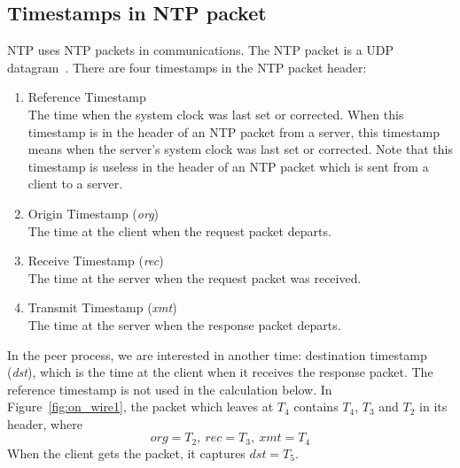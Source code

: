 \subsection{Timestamps in NTP packet}%
\label{sub:timestamps_in_ntp_packet}
NTP uses NTP packets in communications. The NTP packet is a UDP
datagram~\cite{rfc5905}. There are four timestamps in the NTP packet header:
\begin{enumerate}
    \item Reference Timestamp\\
        The time when the system clock was last set or corrected. When this
        timestamp is in the header of an NTP packet from a server, this
        timestamp means when the server's system clock was last set or
        corrected. Note that this timestamp is useless in the header of an NTP
        packet which is sent from a client to a server. 
    \item Origin Timestamp (\emph{org})\\
        The time at the client when the request packet departs.
    \item Receive Timestamp (\emph{rec})\\
        The time at the server when the request packet was received.
    \item Transmit Timestamp (\emph{xmt})\\
        The time at the server when the response packet departs.
\end{enumerate}
In the peer process, we are interested in another time: destination
timestamp (\emph{dst}), which is the time at the client when it receives the
response packet. The reference timestamp is not used in the calculation below.
In Figure~\ref{fig:on_wire1}, the packet which leaves at $T_4$ contains $T_4$,
$T_3$ and $T_2$ in its header, where $$ \textit{org} = T_2,~\textit{rec} =
T_3,~\textit{xmt} = T_4 $$ When the client gets the packet, it captures
$\textit{dst} = T_5$.

